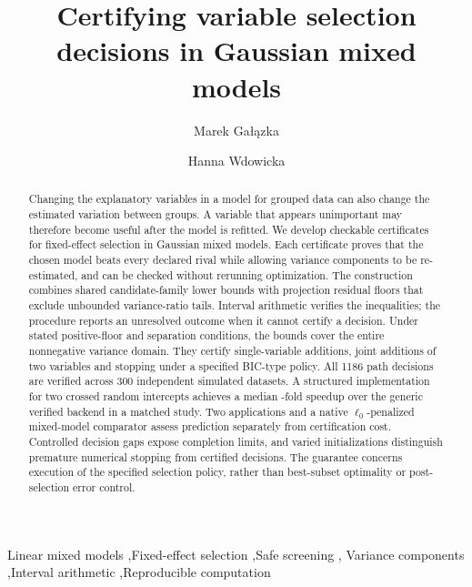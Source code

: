 \documentclass[preprint,11pt,numbers]{elsarticle}
\theoremstyle{remark}\newtheorem{remark}[theorem]{Remark}
\begin{document}
\begin{frontmatter}
\title{Certifying variable selection decisions in Gaussian mixed models}
\author[amu]{Marek Ga\l{}\k{a}zka}
\author[pue]{Hanna Wdowicka}
\address[amu]{Department of Algorithm Theory and Data Security, Faculty of Mathematics and Computer Science, Adam Mickiewicz University, Pozna\'n, Poland}
\address[pue]{Department of Statistics, Pozna\'n University of Economics and Business, Pozna\'n, Poland}
\begin{abstract}
Changing the explanatory variables in a model for grouped data can also change
the estimated variation between groups. A variable that appears unimportant
may therefore become useful after the model is refitted. We develop checkable
certificates for fixed-effect selection in Gaussian mixed models. Each
certificate proves that the chosen model beats every declared rival while
allowing variance components to be re-estimated, and can be checked without
rerunning optimization. The construction combines shared candidate-family
lower bounds with projection residual floors that exclude unbounded
variance-ratio tails. Interval arithmetic verifies the inequalities; the
procedure reports an unresolved outcome when it cannot certify a decision.
Under stated positive-floor and separation conditions, the bounds cover the
entire nonnegative variance domain. They certify single-variable additions,
joint additions of two variables and stopping under a specified BIC-type policy.
All 1186 path decisions are verified across 300 independent simulated datasets.
A structured implementation for two crossed random intercepts achieves a median
\ScalingRatio{}-fold speedup over the generic verified backend in a matched study.
Two applications and a native $\ell_0$-penalized mixed-model comparator assess
prediction separately from certification cost. Controlled decision gaps expose
completion limits, and varied initializations distinguish premature numerical
stopping from certified decisions. The guarantee concerns execution of the
specified selection policy, rather than best-subset optimality or
post-selection error control.
\end{abstract}
\begin{keyword}
Linear mixed models \sep Fixed-effect selection \sep Safe screening \sep
Variance components \sep Interval arithmetic \sep Reproducible computation
\end{keyword}
\end{frontmatter}
\end{document}
